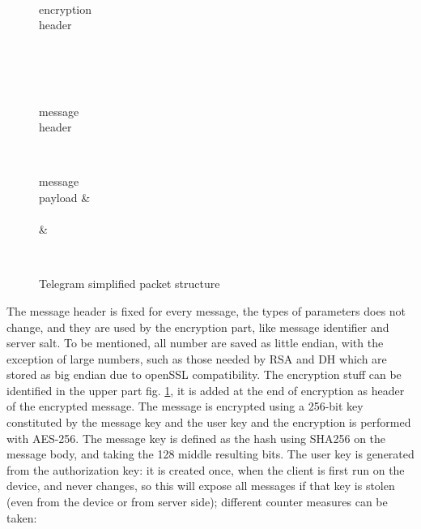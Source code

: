 \documentclass{article}
\begin{document}
\begin{figure}[H]
	\centering
	\begin{bytefield}[bitwidth=0.55em]{64}
		 \\
		\begin{rightwordgroup}{encryption \\ header}
			 \\
			 \\
		\end{rightwordgroup} \\
		\\
		\begin{rightwordgroup}{message \\ header}
			 \\
		\end{rightwordgroup}
		\\
		\begin{rightwordgroup}{message \\ payload}
			 &  \\
			 \\
			& 
		\end{rightwordgroup} \\
	\end{bytefield}
	\caption{Telegram simplified packet structure}
	\label{fig:tel_pack}
\end{figure}

The message header is fixed for every message, the types of parameters does not change, and they are used by the encryption part, like message identifier and server salt.\newline
To be mentioned, all number are saved as little endian, with the exception of large numbers, such as those needed by RSA and DH which are stored as big endian due to openSSL compatibility.\newline
The encryption stuff can be identified in the upper part fig. \ref{fig:tel_pack}, it is added at the end of encryption as header of the encrypted message. The message is encrypted using a 256-bit key constituted by the message key and the user key and the encryption is performed with AES-256. The message key is defined as the hash using SHA256 on the message body, and taking the 128 middle resulting bits. The user key is generated from the authorization key: it is created once, when the client is first run on the device, and never changes, so this will expose all messages if that key is stolen (even from the device or from server side); different counter measures can be taken: 
\end{document}
